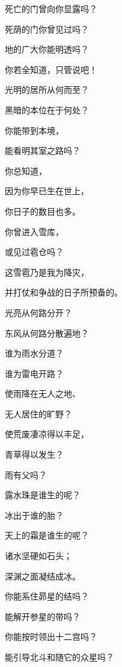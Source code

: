 {\par }{\Q {}死亡的门曾向你显露吗？
\par }{\Q 死荫的门你曾见过吗？
\par }{\Q {}地的广大你能明透吗？
\par }{\Q 你若全知道，只管说吧！
\par }{\BB \par }{\Q {}光明的居所从何而至？
\par }{\Q 黑暗的本位在于何处？
\par }{\Q {}你能带到本境，
\par }{\Q 能看明其室之路吗？
\par }{\Q {}你总知道，
\par }{\Q 因为你早已生在世上，
\par }{\Q 你日子的数目也多。
\par }{\BB \par }{\Q {}你曾进入雪库，
\par }{\Q 或见过雹仓吗？
\par }{\Q {}这雪雹乃是我为降灾，
\par }{\Q 并打仗和争战的日子所预备的。
\par }{\Q {}光亮从何路分开？
\par }{\Q 东风从何路分散遍地？
\par }{\BB \par }{\Q {}谁为雨水分道？
\par }{\Q 谁为雷电开路？
\par }{\Q {}使雨降在无人之地、
\par }{\Q 无人居住的旷野？
\par }{\Q {}使荒废凄凉{}得以丰足，
\par }{\Q 青草得以发生？
\par }{\Q {}雨有父吗？
\par }{\Q 露水珠是谁生的呢？
\par }{\Q {}冰出于谁的胎？
\par }{\Q 天上的霜是谁生的呢？
\par }{\Q {}诸水坚硬如石头；
\par }{\Q 深渊之面凝结成冰。
\par }{\BB \par }{\Q {}你能系住昴星的结吗？
\par }{\Q 能解开参星的带吗？
\par }{\Q {}你能按时领出十二宫吗？
\par }{\Q 能引导北斗和随它的众星吗？
}
